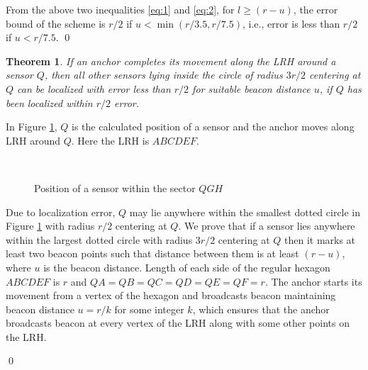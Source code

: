\documentclass[preprint,11pt]{elsarticle}
\newtheorem{theorem}{Theorem}
\newenvironment{proof}{\noindent{\bf Proof: }}{\qed \smallbreak}
\begin{document}
\begin{proof}
From the above two inequalities \ref{eq:1} and \ref{eq:2}, for $l\geq (r-u)$, the error bound of the scheme \cite{Lee2009}
is $r/2$ if $u<\min(r/3.5, r/7.5)$, i.e., error is less than $r/2$ if $u<r/7.5$.
\end{proof}

\begin{theorem}
\label{the2:localz}
If an anchor completes its movement along the LRH around a sensor $Q$, then all other sensors lying inside the circle of radius $3r/2$ centering at $Q$ can be localized with error less than $r/2$ for suitable beacon distance $u$,
if $Q$ has been localized within $r/2$ error.
\end{theorem}
\begin{proof}
In Figure \ref{f:fig5}, $Q$ is the calculated position of a sensor and the anchor moves along LRH around $Q$.
Here the LRH is $ABCDEF$.
\begin{figure}[h]
    \centering
     ~~~~~~~~~
\caption{Position of a sensor within the sector $QGH$}\label{f:fig5}
\end{figure}
Due to localization error, $Q$ may lie anywhere within the smallest dotted circle in Figure \ref{f:fig5}
with radius $r/2$ centering at $Q$.
We prove that if a sensor lies anywhere within the largest dotted circle with radius $3r/2$ centering at $Q$
then it marks at least  two beacon points such that distance between them is at least $(r-u)$, where $u$ is the beacon
distance. Length of each side of the regular hexagon $ABCDEF$ is $r$ and $QA=QB=QC=QD=QE=QF=r$. The anchor starts
its movement from a vertex of the hexagon and broadcasts beacon maintaining beacon distance $u=r/k$ for some integer $k$,
which ensures that the anchor broadcasts beacon at every vertex of the LRH along with some other points on the LRH.


\end{proof}
\end{document}
